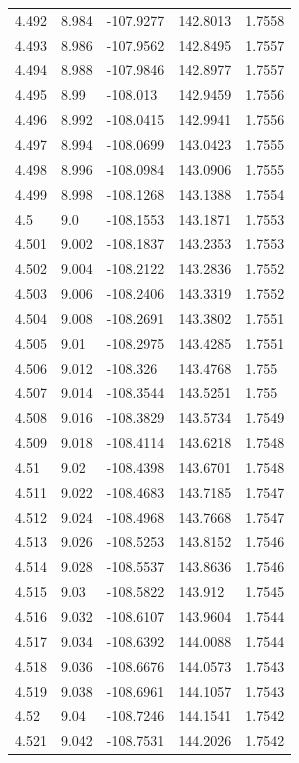 \begin{tabular}{lllll}
4.492 & 8.984 & -107.9277 & 142.8013 & 1.7558 \\
4.493 & 8.986 & -107.9562 & 142.8495 & 1.7557 \\
4.494 & 8.988 & -107.9846 & 142.8977 & 1.7557 \\
4.495 & 8.99 & -108.013 & 142.9459 & 1.7556 \\
4.496 & 8.992 & -108.0415 & 142.9941 & 1.7556 \\
4.497 & 8.994 & -108.0699 & 143.0423 & 1.7555 \\
4.498 & 8.996 & -108.0984 & 143.0906 & 1.7555 \\
4.499 & 8.998 & -108.1268 & 143.1388 & 1.7554 \\
4.5 & 9.0 & -108.1553 & 143.1871 & 1.7553 \\
4.501 & 9.002 & -108.1837 & 143.2353 & 1.7553 \\
4.502 & 9.004 & -108.2122 & 143.2836 & 1.7552 \\
4.503 & 9.006 & -108.2406 & 143.3319 & 1.7552 \\
4.504 & 9.008 & -108.2691 & 143.3802 & 1.7551 \\
4.505 & 9.01 & -108.2975 & 143.4285 & 1.7551 \\
4.506 & 9.012 & -108.326 & 143.4768 & 1.755 \\
4.507 & 9.014 & -108.3544 & 143.5251 & 1.755 \\
4.508 & 9.016 & -108.3829 & 143.5734 & 1.7549 \\
4.509 & 9.018 & -108.4114 & 143.6218 & 1.7548 \\
4.51 & 9.02 & -108.4398 & 143.6701 & 1.7548 \\
4.511 & 9.022 & -108.4683 & 143.7185 & 1.7547 \\
4.512 & 9.024 & -108.4968 & 143.7668 & 1.7547 \\
4.513 & 9.026 & -108.5253 & 143.8152 & 1.7546 \\
4.514 & 9.028 & -108.5537 & 143.8636 & 1.7546 \\
4.515 & 9.03 & -108.5822 & 143.912 & 1.7545 \\
4.516 & 9.032 & -108.6107 & 143.9604 & 1.7544 \\
4.517 & 9.034 & -108.6392 & 144.0088 & 1.7544 \\
4.518 & 9.036 & -108.6676 & 144.0573 & 1.7543 \\
4.519 & 9.038 & -108.6961 & 144.1057 & 1.7543 \\
4.52 & 9.04 & -108.7246 & 144.1541 & 1.7542 \\
4.521 & 9.042 & -108.7531 & 144.2026 & 1.7542 \\

\end{tabular}
